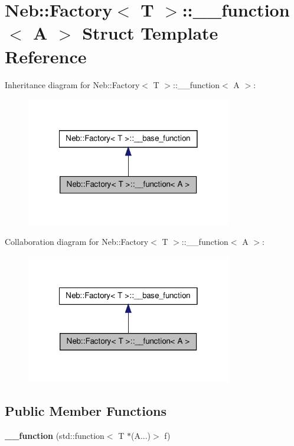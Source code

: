 \hypertarget{structNeb_1_1Factory_1_1____function}{\section{\-Neb\-:\-:\-Factory$<$ \-T $>$\-:\-:\-\_\-\-\_\-function$<$ \-A $>$ \-Struct \-Template \-Reference}
\label{structNeb_1_1Factory_1_1____function}
}


\-Inheritance diagram for \-Neb\-:\-:\-Factory$<$ \-T $>$\-:\-:\-\_\-\-\_\-function$<$ \-A $>$\-:\nopagebreak
\begin{figure}[H]
\begin{center}
\leavevmode
\includegraphics[width=254pt]{structNeb_1_1Factory_1_1____function__inherit__graph}
\end{center}
\end{figure}


\-Collaboration diagram for \-Neb\-:\-:\-Factory$<$ \-T $>$\-:\-:\-\_\-\-\_\-function$<$ \-A $>$\-:\nopagebreak
\begin{figure}[H]
\begin{center}
\leavevmode
\includegraphics[width=254pt]{structNeb_1_1Factory_1_1____function__coll__graph}
\end{center}
\end{figure}
\subsection*{\-Public \-Member \-Functions}
\begin{DoxyCompactItemize}
\item 
\hypertarget{structNeb_1_1Factory_1_1____function_a0a6084f8316dc28c750ea365f18b7184}{{\bfseries \-\_\-\-\_\-function} (std\-::function$<$ \-T $\ast$(\-A...)$>$ f)}\label{structNeb_1_1Factory_1_1____function_a0a6084f8316dc28c750ea365f18b7184}

\end{DoxyCompactItemize}
